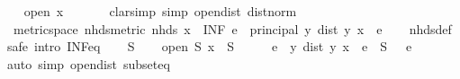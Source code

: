 \begin{isabellebody}
\ \isamarkupfalse%
\ {\isachardoublequoteopen}{\isasymnot}\ open\ {\isacharbraceleft}{\kern0pt}x{\isacharbraceright}{\kern0pt}{\isachardoublequoteclose}\ \isanewline
\ \ \ \ \isamarkupfalse%
\ {\isacharparenleft}{\kern0pt}clarsimp\ simp{\isacharcolon}{\kern0pt}\ open{\isacharunderscore}{\kern0pt}dist\ dist{\isacharunderscore}{\kern0pt}norm{\isacharparenright}{\kern0pt}\isanewline
{}\isamarkupfalse%
%
\endisatagproof
{\isafoldproof}%
%
\isadelimproof
%
\endisadelimproof
%
\isadelimdocument
%
\endisadelimdocument
%
\isatagdocument
%
\isamarkuptrue%
%
\endisatagdocument
{\isafolddocument}%
%
\isadelimdocument
%
\endisadelimdocument
{}\isamarkupfalse%
\ {\isacharparenleft}{\kern0pt}\ metric{\isacharunderscore}{\kern0pt}space{\isacharparenright}{\kern0pt}\ nhds{\isacharunderscore}{\kern0pt}metric{\isacharcolon}{\kern0pt}\ {\isachardoublequoteopen}nhds\ x\ {\isacharequal}{\kern0pt}\ {\isacharparenleft}{\kern0pt}INF\ e{\isasymin}{\isacharbraceleft}{\kern0pt}{}\ {\isacharless}{\kern0pt}{\isachardot}{\kern0pt}{\isachardot}{\kern0pt}{\isacharbraceright}{\kern0pt}{\isachardot}{\kern0pt}\ principal\ {\isacharbraceleft}{\kern0pt}y{\isachardot}{\kern0pt}\ dist\ y\ x\ {\isacharless}{\kern0pt}\ e{\isacharbraceright}{\kern0pt}{\isacharparenright}{\kern0pt}{\isachardoublequoteclose}\isanewline
%
\isadelimproof
\ \ %
\endisadelimproof
%
\isatagproof
{}\isamarkupfalse%
\ nhds{\isacharunderscore}{\kern0pt}def\isanewline
{}\isamarkupfalse%
\ {\isacharparenleft}{\kern0pt}safe\ intro{\isacharbang}{\kern0pt}{\isacharcolon}{\kern0pt}\ INF{\isacharunderscore}{\kern0pt}eq{\isacharparenright}{\kern0pt}\isanewline
\ \ \isamarkupfalse%
\ S\isanewline
\ \ \isamarkupfalse%
\ {\isachardoublequoteopen}open\ S{\isachardoublequoteclose}\ {\isachardoublequoteopen}x\ {\isasymin}\ S{\isachardoublequoteclose}\isanewline
\ \ \isamarkupfalse%
\ \isamarkupfalse%
\ e\ \ {\isachardoublequoteopen}{\isacharbraceleft}{\kern0pt}y{\isachardot}{\kern0pt}\ dist\ y\ x\ {\isacharless}{\kern0pt}\ e{\isacharbraceright}{\kern0pt}\ {\isasymsubseteq}\ S{\isachardoublequoteclose}\ {\isachardoublequoteopen}{}\ {\isacharless}{\kern0pt}\ e{\isachardoublequoteclose}\isanewline
\ \ \ \ \isamarkupfalse%
\ {\isacharparenleft}{\kern0pt}auto\ simp{\isacharcolon}{\kern0pt}\ open{\isacharunderscore}{\kern0pt}dist\ subset{\isacharunderscore}{\kern0pt}eq{\isacharparenright}{\kern0pt}\isanewline

\end{isabellebody}
